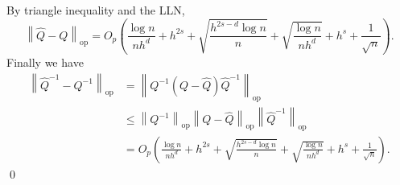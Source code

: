 \documentclass[11pt]{article}
\begin{document}
By triangle inequality and the LLN,
\begin{equation}
    \left\|\hat{Q} - Q\right\|_{\text{op}} = O_p\left(\frac{\log n}{nh^d} + h^{2s} + \sqrt{\frac{h^{2s-d}\log n}{n}} + \sqrt{\frac{\log n}{nh^d}} + h^s + \frac{1}{\sqrt{n}}\right).
\end{equation}
Finally we have
\begin{align}
    \left\|\hat{Q}^{-1} - Q^{-1}\right\|_{\text{op}} &= \left\|Q^{-1}\left(Q - \hat{Q}\right)\hat{Q}^{-1}\right\|_{\text{op}} \\
    &\leq \left\|Q^{-1}\right\|_{\text{op}}\left\|Q - \hat{Q}\right\|_{\text{op}}\left\|\hat{Q}^{-1}\right\|_{\text{op}}\\
    &= O_p\left(\frac{\log n}{nh^d} + h^{2s} + \sqrt{\frac{h^{2s-d}\log n}{n}} + \sqrt{\frac{\log n}{nh^d}} + h^s + \frac{1}{\sqrt{n}}\right).
\end{align}
\qed{}


\end{document}
